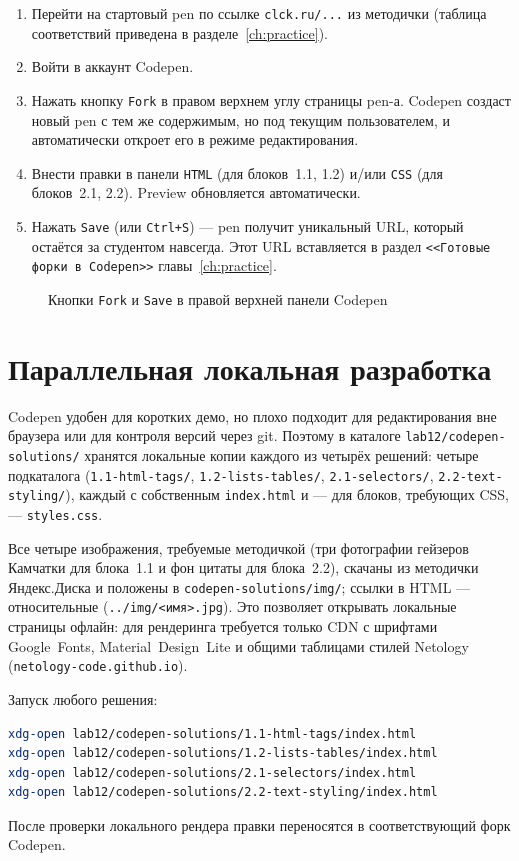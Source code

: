 \begin{enumerate}
  \item Перейти на стартовый pen по ссылке \texttt{clck.ru/...} из
        методички (таблица соответствий приведена в разделе~\ref{ch:practice}).
  \item Войти в аккаунт Codepen.
  \item Нажать кнопку \texttt{Fork} в правом верхнем углу страницы
        pen-а. Codepen создаст новый pen с тем же содержимым, но
        под текущим пользователем, и автоматически откроет его в
        режиме редактирования.
  \item Внести правки в панели \texttt{HTML} (для блоков~1.1, 1.2)
        и/или \texttt{CSS} (для блоков~2.1, 2.2). Preview
        обновляется автоматически.
  \item Нажать \texttt{Save} (или \texttt{Ctrl+S}) --- pen
        получит уникальный URL, который остаётся за студентом
        навсегда. Этот URL вставляется в раздел \texttt{<<Готовые
        форки в Codepen>>} главы~\ref{ch:practice}.
\end{enumerate}

\begin{figure}[h]
  \centering
  \caption{Кнопки \texttt{Fork} и \texttt{Save} в правой верхней панели Codepen}
  \label{fig:codepen_fork}
\end{figure}

\section{Параллельная локальная разработка}

Codepen удобен для коротких демо, но плохо подходит для редактирования
вне браузера или для контроля версий через git. Поэтому в каталоге
\texttt{lab12/codepen-solutions/} хранятся локальные копии каждого
из четырёх решений: четыре подкаталога (\texttt{1.1-html-tags/},
\texttt{1.2-lists-tables/}, \texttt{2.1-selectors/},
\texttt{2.2-text-styling/}), каждый с собственным \texttt{index.html}
и --- для блоков, требующих CSS, --- \texttt{styles.css}.

Все четыре изображения, требуемые методичкой (три фотографии гейзеров
Камчатки для блока~1.1 и фон цитаты для блока~2.2), скачаны из
методички Яндекс.Диска и положены в \texttt{codepen-solutions/img/};
ссылки в HTML --- относительные (\texttt{../img/<имя>.jpg}).
Это позволяет открывать локальные страницы офлайн: для рендеринга
требуется только CDN с шрифтами Google~Fonts, Material~Design~Lite
и общими таблицами стилей Netology (\texttt{netology-code.github.io}).

Запуск любого решения:
\begin{lstlisting}[language=bash]
xdg-open lab12/codepen-solutions/1.1-html-tags/index.html
xdg-open lab12/codepen-solutions/1.2-lists-tables/index.html
xdg-open lab12/codepen-solutions/2.1-selectors/index.html
xdg-open lab12/codepen-solutions/2.2-text-styling/index.html
\end{lstlisting}

После проверки локального рендера правки переносятся в
соответствующий форк Codepen.

\endinput
